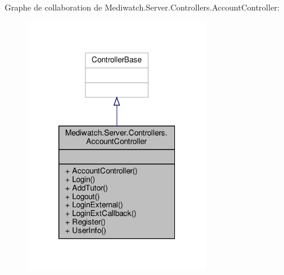 Graphe de collaboration de Mediwatch.\+Server.\+Controllers.\+Account\+Controller\+:\nopagebreak
\begin{figure}[H]
\begin{center}
\leavevmode
\includegraphics[width=229pt]{class_mediwatch_1_1_server_1_1_controllers_1_1_account_controller__coll__graph}
\end{center}
\end{figure}
